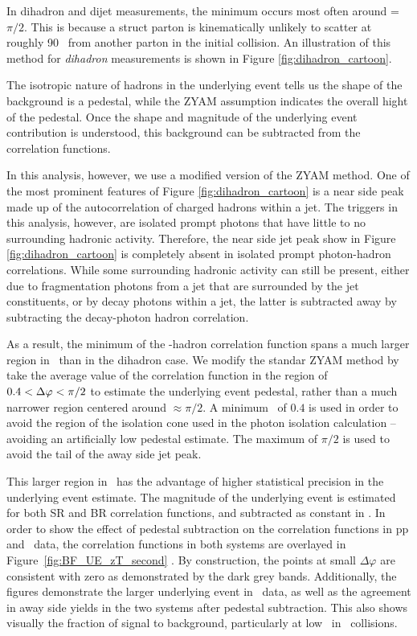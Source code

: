 In dihadron and dijet measurements, the minimum occurs most often around \deltaphi = $\pi/2$. This is because a struct parton is kinematically unlikely to scatter at roughly 90 \degree~from another parton in the initial collision. An illustration of this method for \textit{dihadron} measurements is shown in Figure \ref{fig:dihadron_cartoon}.

The isotropic nature of hadrons in the underlying event tells us the shape of the background is a pedestal, while the ZYAM assumption indicates the overall hight of the pedestal. Once the shape and magnitude of the underlying event contribution is understood, this background can be subtracted from the correlation functions. 

In this analysis, however, we use a modified version of the ZYAM method. One of the most prominent features of Figure \ref{fig:dihadron_cartoon} is a near side peak made up of the autocorrelation of charged hadrons within a jet. The triggers in this analysis, however, are isolated prompt photons that have little to no surrounding hadronic activity.  Therefore, the near side jet peak show in Figure \ref{fig:dihadron_cartoon} is completely absent in isolated prompt photon-hadron correlations. While some surrounding hadronic activity can still be present, either due to fragmentation photons from a jet that are surrounded by the jet constituents, or by decay photons within a jet, the latter is subtracted away by subtracting the decay-photon hadron correlation.

As a result, the minimum of the \gammaiso-hadron correlation function spans a much larger region in \deltaphi~than in the dihadron case. We modify the standar ZYAM method by take the average value of the correlation function in the region of $0.4 < \Delta\varphi < \pi/2$ to estimate the underlying event pedestal, rather than a much narrower region centered around \deltaphi$\approx \pi/2$.  A minimum \deltaphi~of $0.4$ is used in order to avoid the region of the isolation cone used in the photon isolation calculation -- avoiding an artificially low pedestal estimate. The maximum of $\pi/2$ is used to avoid the tail of the away side jet peak.

This larger region in \deltaphi~has the advantage of higher statistical precision in the underlying event estimate. The magnitude of the underlying event is estimated for both SR and BR correlation functions, and subtracted as constant in \deltaphi. In order to show the effect of pedestal subtraction on the correlation functions in pp and \pPb~data, the correlation functions in both systems are overlayed in Figure~\ref{fig:BF_UE_zT_second} . By construction, the points at small $\Delta\varphi$ are consistent with zero as demonstrated by the dark grey bands. Additionally, the figures demonstrate the larger underlying event in \pPb~data, as well as the agreement in away side yields in the two systems after pedestal subtraction. This also shows visually the fraction of signal to background, particularly at low \zt~in \pPb~collisions.


